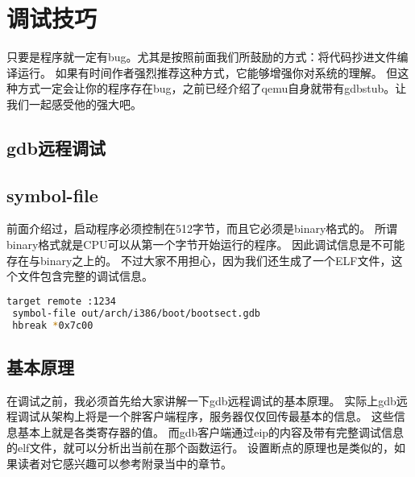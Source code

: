 \section{调试技巧}
只要是程序就一定有bug。尤其是按照前面我们所鼓励的方式：将代码抄进文件编译运行。
如果有时间作者强烈推荐这种方式，它能够增强你对系统的理解。
但这种方式一定会让你的程序存在bug，之前已经介绍了qemu自身就带有gdbstub。让我们一起感受他的强大吧。
\subsection{gdb远程调试}
\subsection{symbol-file}
前面介绍过，启动程序必须控制在512字节，而且它必须是binary格式的。
所谓binary格式就是CPU可以从第一个字节开始运行的程序。
因此调试信息是不可能存在与binary之上的。
不过大家不用担心，因为我们还生成了一个ELF文件，这个文件包含完整的调试信息。
\begin{lstlisting}[language=bash]
 target remote :1234
 symbol-file out/arch/i386/boot/bootsect.gdb
 hbreak *0x7c00
\end{lstlisting}
\subsection{基本原理}
在调试之前，我必须首先给大家讲解一下gdb远程调试的基本原理。
实际上gdb远程调试从架构上将是一个胖客户端程序，服务器仅仅回传最基本的信息。
这些信息基本上就是各类寄存器的值。
而gdb客户端通过eip的内容及带有完整调试信息的elf文件，就可以分析出当前在那个函数运行。
设置断点的原理也是类似的，如果读者对它感兴趣可以参考附录当中的章节。
